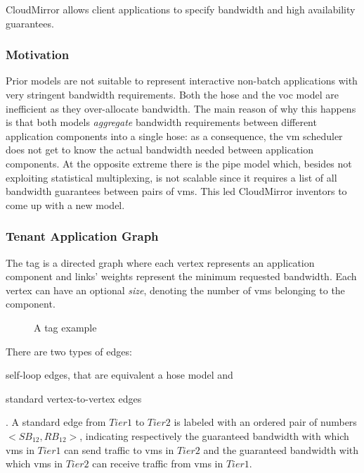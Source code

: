 CloudMirror \cite{cloudmirror} allows client applications to specify bandwidth and high availability guarantees.

\subsubsection{Motivation} \label{why_tag}
Prior models are not suitable to represent interactive non-batch applications with very stringent bandwidth requirements.
Both the hose and the \gls{voc} model are inefficient as they over-allocate bandwidth.
The main reason of why this happens is that both models \textit{aggregate} bandwidth requirements between different application components into a single hose: as a consequence, the \gls{vm} scheduler does not get to know the actual bandwidth needed between application components.
At the opposite extreme there is the pipe model which, besides not exploiting statistical multiplexing, is not scalable since it requires a list of all bandwidth guarantees between pairs of \glspl{vm}.
This led CloudMirror \cite{cloudmirror} inventors to come up with a new model.

\subsubsection{Tenant Application Graph} \label{tag_description}
The \gls{tag} is a directed graph where each vertex represents an application component and links' weights represent the minimum requested bandwidth. Each vertex can have an optional \textit{size}, denoting the number of \glspl{vm} belonging to the component.

\begin{figure}[!htb]
    \centering
    \usebox{\tagfigure}
    \caption{A \gls{tag} example}
\end{figure}

There are two types of edges:
\begin{mylist}
    \item self-loop edges, that are equivalent a hose model and
    \item standard vertex-to-vertex edges
\end{mylist}.
A standard edge from $Tier 1$ to $Tier 2$ is labeled with an ordered pair of numbers $<SB_12, RB_12>$, indicating respectively the guaranteed bandwidth with which \glspl{vm} in $Tier 1$ can send traffic to \glspl{vm} in $Tier 2$ and the guaranteed bandwidth with which \glspl{vm} in $Tier 2$ can receive traffic from \glspl{vm} in $Tier 1$.

